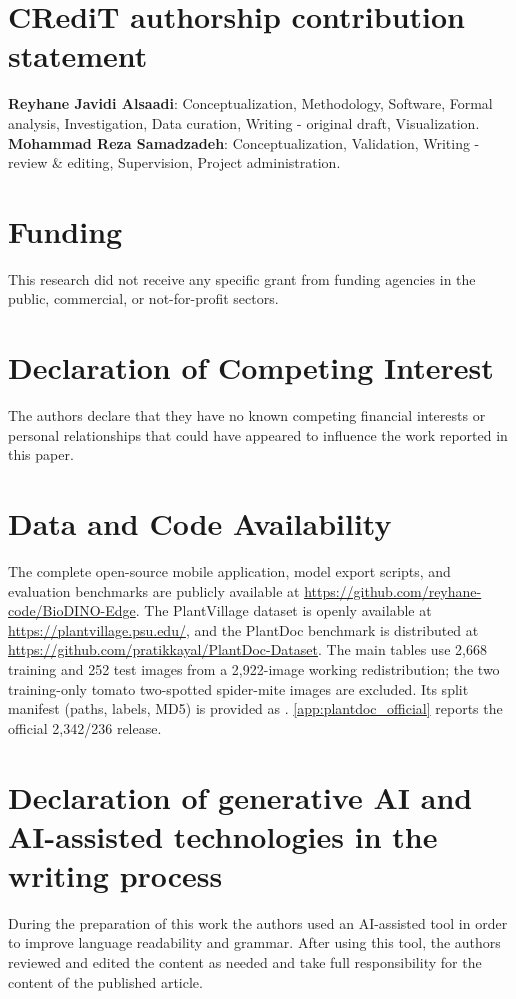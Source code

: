\section*{CRediT authorship contribution statement}
\textbf{Reyhane Javidi Alsaadi}: Conceptualization, Methodology, Software, Formal analysis, Investigation, Data curation, Writing - original draft, Visualization.
\textbf{Mohammad Reza Samadzadeh}: Conceptualization, Validation, Writing - review \& editing, Supervision, Project administration.

\section*{Funding}
This research did not receive any specific grant from funding agencies in the public, commercial, or not-for-profit sectors.

\section*{Declaration of Competing Interest}
The authors declare that they have no known competing financial interests or personal relationships that could have appeared to influence the work reported in this paper.

\section*{Data and Code Availability}
The complete open-source mobile application, model export scripts, and evaluation benchmarks are publicly available at \url{https://github.com/reyhane-code/BioDINO-Edge}. The PlantVillage dataset is openly available at \url{https://plantvillage.psu.edu/}, and the PlantDoc benchmark is distributed at \url{https://github.com/pratikkayal/PlantDoc-Dataset}. The main tables use 2{,}668 training and 252 test images from a 2{,}922-image working redistribution; the two training-only tomato two-spotted spider-mite images are excluded. Its split manifest (paths, labels, MD5) is provided as . \ref{app:plantdoc_official} reports the official 2{,}342/236 release.

\section*{Declaration of generative AI and AI-assisted technologies in the writing process}
During the preparation of this work the authors used an AI-assisted tool in order to improve language readability and grammar. After using this tool, the authors reviewed and edited the content as needed and take full responsibility for the content of the published article.

